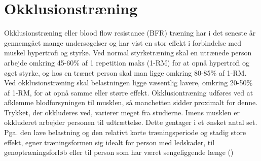 \section{Okklusionstræning}
Okklusionstræning eller blood flow resistance (BFR) træning har i det seneste år gennemgået mange undersøgelser og har vist en stor effekt i forbindelse med muskel hypertrofi og styrke. Ved normal styrketræning skal en utrænede person arbejde omkring 45-60\% af 1 repetition maks (1-RM) for at opnå hypertrofi og øget styrke, og hos en trænet person skal man ligge omkring 80-85\% af 1-RM. Ved okklusionstræning skal belastningen ligge væsentlig lavere, omkring 20-50\% af 1-RM, for at opnå samme eller større effekt. 
Okklusiontræning udføres ved at afklemme blodforsyningen til musklen, så manchetten sidder proximalt for denne. Trykket, der okkluderes ved, varierer meget fra studierne. Imens musklen er okkluderet arbejder personen til udtrættelse. Dette gentager i et ønsket antal set. 
Pga. den lave belastning og den relativt korte træningsperiode og stadig store effekt, egner træningsformen sig idealt for person med ledskader, til genoptræningsforløb eller til person som har været sengeliggende længe (\cite{RefWorks:38})









